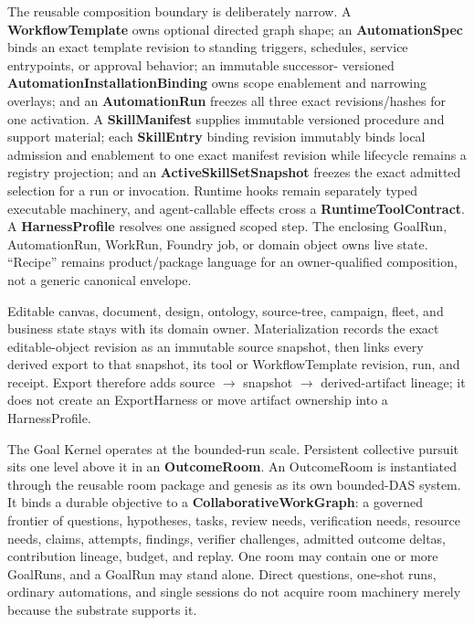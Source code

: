 \documentclass[
  11pt,
]{article}
\begin{document}
The reusable composition boundary is deliberately narrow. A
\textbf{WorkflowTemplate} owns optional directed graph shape; an
\textbf{AutomationSpec} binds an exact template revision to standing triggers,
schedules, service entrypoints, or approval behavior; an immutable successor-
versioned \textbf{AutomationInstallationBinding} owns scope enablement and
narrowing overlays; and an \textbf{AutomationRun} freezes all three exact
revisions/hashes for one activation. A \textbf{SkillManifest} supplies
immutable versioned procedure and support material; each \textbf{SkillEntry}
binding revision immutably binds local admission and enablement to one exact
manifest revision while lifecycle remains a registry projection; and
an \textbf{ActiveSkillSetSnapshot} freezes the exact admitted selection for a
run or invocation. Runtime hooks remain separately typed executable machinery,
and agent-callable effects cross a \textbf{RuntimeToolContract}. A
\textbf{HarnessProfile} resolves one assigned scoped step. The enclosing
GoalRun, AutomationRun, WorkRun, Foundry job, or domain object owns live state.
``Recipe'' remains product/package language for an owner-qualified composition,
not a generic canonical envelope.

Editable canvas, document, design, ontology, source-tree, campaign, fleet, and
business state stays with its domain owner. Materialization records the exact
editable-object revision as an immutable source snapshot, then links every
derived export to that snapshot, its tool or WorkflowTemplate revision, run,
and receipt. Export therefore adds source $\rightarrow$ snapshot
$\rightarrow$ derived-artifact lineage; it does not create an ExportHarness or
move artifact ownership into a HarnessProfile.

The Goal Kernel operates at the bounded-run scale. Persistent collective
pursuit sits one level above it in an \textbf{OutcomeRoom}. An OutcomeRoom
is instantiated through the reusable room package and genesis as its own
bounded-DAS system. It binds a durable objective to a
\textbf{CollaborativeWorkGraph}: a governed
frontier of questions, hypotheses, tasks, review needs, verification needs,
resource needs, claims, attempts, findings, verifier challenges, admitted
outcome deltas, contribution lineage, budget, and replay. One room may contain
one or more GoalRuns, and a GoalRun may stand alone. Direct questions,
one-shot runs, ordinary automations, and single sessions do not acquire room
machinery merely because the substrate supports it.
\end{document}
